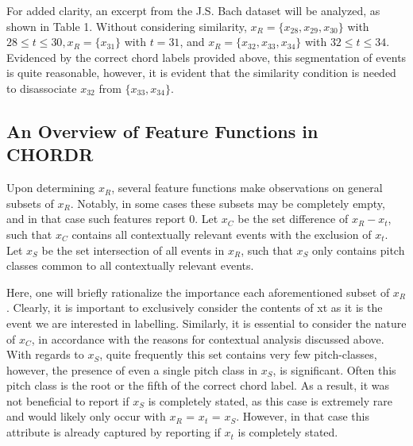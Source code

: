 \documentclass{article} %
\begin{document}
For added clarity, an excerpt from the J.S. Bach dataset will be analyzed, as shown in Table 1. Without considering similarity, $x_R = \{ x_{28}, x_{29}, x_{30} \}$ with $28 \leq t \leq 30, x_R = \{ x_{31} \}$ with $t = 31$, and $x_R = \{ x_{32}, x_{33}, x_{34} \}$ with $32 \leq t \leq 34$. Evidenced by the correct chord labels provided above, this segmentation of events is quite reasonable, however, it is evident that the similarity condition is needed to disassociate $x_{32}$ from $\{ x_{33}, x_{34} \}$.

\subsection{An Overview of Feature Functions in CHORDR}

Upon determining $x_R$, several feature functions make observations on general subsets of $x_R$. Notably, in some cases these subsets may be completely empty, and in that case such features report 0. Let $x_C$ be the set difference of $x_R - x_t$, such that $x_C$ contains all contextually relevant events with the exclusion of $x_t$. Let $x_S$ be the set intersection of all events in $x_R$, such that $x_S$ only contains pitch classes common to all contextually relevant events.

Here, one will briefly rationalize the importance each aforementioned subset of $x_R$. Clearly, it is important to exclusively consider the contents of xt as it is the event we are interested in labelling. Similarly, it is essential to consider the nature of $x_C$, in accordance with the reasons for contextual analysis discussed above. With regards to $x_S$, quite frequently this set contains very few pitch-classes, however, the presence of even a single pitch class in $x_S$, is significant. Often this pitch class is the root or the fifth of the correct chord label. As a result, it was not beneficial to report if $x_S$ is completely stated, as this case is extremely rare and would likely only occur with $x_R$ = $x_t$ = $x_S$. However, in that case this attribute is already captured by reporting if $x_t$ is completely stated.

\end{document}
